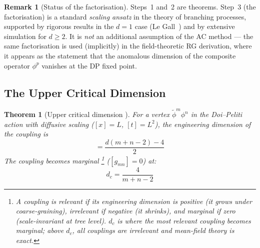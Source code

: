 \documentclass[11pt,a4paper]{article}
\newtheorem{theorem}{Theorem}[section]
\theoremstyle{definition}
\newtheorem*{remark}{Remark}
\newcommand{\phit}{\tilde{\phi}}
\begin{document}
\begin{remark}[Status of the factorisation]
Steps~1 and~2 are theorems. Step~3 (the factorisation) is a standard
\emph{scaling ansatz} in the theory of branching processes, supported
by rigorous results in the $d = 1$ case (Le Gall~\cite{legall1999})
and by extensive simulation for $d \geq 2$. It is \emph{not} an
additional assumption of the AC method --- the same factorisation is
used (implicitly) in the field-theoretic RG derivation, where it appears
as the statement that the anomalous dimension of the composite operator
$\phi^p$ vanishes at the DP fixed point.
\end{remark}

\subsection{The Upper Critical Dimension}

\begin{theorem}[Upper critical dimension {\cite{tauber2005,amarteifio2019}}]
\label{thm:d_c}
For a vertex $\phit^m \phi^n$ in the Doi--Peliti action with diffusive
scaling ($[x] = L$, $[t] = L^2$), the engineering dimension of the
coupling is
\begin{equation}
[g_{mn}] = \frac{d(m+n-2) - 4}{2}
\end{equation}
The coupling becomes marginal%
\footnote{A coupling is \emph{relevant} if its engineering dimension is
positive (it grows under coarse-graining), \emph{irrelevant} if negative
(it shrinks), and \emph{marginal} if zero (scale-invariant at tree level).
$d_c$ is where the most relevant coupling becomes marginal; above $d_c$,
all couplings are irrelevant and mean-field theory is exact.}
($[g_{mn}] = 0$) at:
\begin{equation}
\boxed{d_c = \frac{4}{m + n - 2}}
\label{eq:dc}
\end{equation}
\end{theorem}
\end{document}
